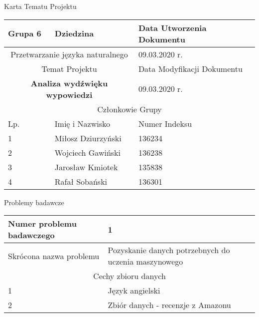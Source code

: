 \documentclass[11pt,a4paper]{article}
\begin{document}
\begin{center}
    \Large
    Karta Tematu Projektu
\end{center}
\begin{center}
\begin{table}[h]
    \centering
    \begin{tabular}{|p{3cm}|p{5cm}|p{5cm}|}
         \hline
         Grupa 6 & Dziedzina & Data Utworzenia Dokumentu \\ \hline
        \multicolumn{2}{|c|}{Przetwarzanie języka naturalnego} & 09.03.2020 r. \\ \hline
         \multicolumn{2}{|c|}{Temat Projektu} & Data Modyfikacji Dokumentu \\ \hline
         \multicolumn{2}{|c|}{\textbf{Analiza wydźwięku wypowiedzi}} & 09.03.2020 r. \\ \hline
         \multicolumn{3}{|c|}{Członkowie Grupy} \\ \hline
         Lp. & Imię i Nazwisko & Numer Indeksu \\ \hline     
         1 & Miłosz Dziurzyński & 136234 \\ \hline
         2 & Wojciech Gawiński & 136238 \\ \hline
         3 & Jarosław Kmiotek & 135838 \\ \hline
         4 & Rafał Sobański & 136301 \\ \hline
    \end{tabular}
    \label{tab:my_label}
\end{table}
\end{center}

\large
\center
Problemy badawcze

\begin{center}
\end{center}
\begin{table}[h]
    \centering
    \begin{tabular}{|p{4.5cm}|p{9cm}|}
        \hline
         Numer problemu badawczego & 1 \\
         \hline
         Skrócona nazwa problemu & Pozyskanie danych potrzebnych do uczenia maszynowego\\
         \hline
         \multicolumn{2}{|c|}{Cechy zbioru danych} \\ \hline
         1 &  Język angielski \\ \hline
         2 &  Zbiór danych - recenzje z Amazonu\\ \hline
    \end{tabular}
    \label{tab:my_label}
\end{table}
\end{document}
